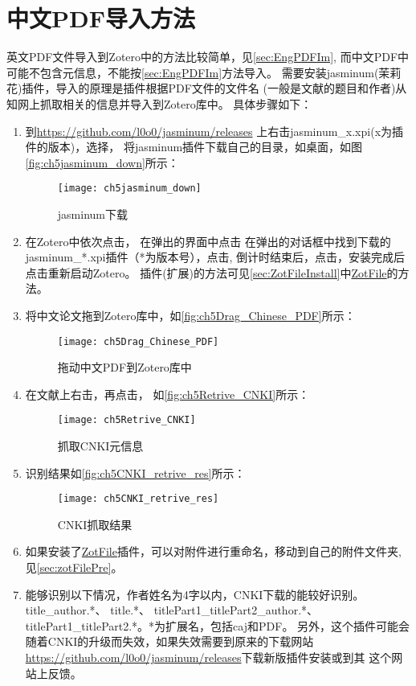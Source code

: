 \documentclass[cn,11pt,chinese]{elegantbook}
\begin{document}
		\section{中文PDF导入方法}\label{sec:Chinese_PDF}
			英文PDF文件导入到Zotero中的方法比较简单，见\cref{sec:EngPDFIm},
			而中文PDF中可能不包含元信息，不能按\cref{sec:EngPDFIm}方法导入。
			需要安装jasminum(茉莉花)插件，导入的原理是插件根据PDF文件的文件名
			(一般是文献的题目和作者)从知网上抓取相关的信息并导入到Zotero库中。
			具体步骤如下：
			\begin{enumerate}
				\item 到\url{https://github.com/l0o0/jasminum/releases}
				上右击jasminum\_x.xpi(x为插件的版本)，选择，
				将jasminum插件下载自己的目录，如桌面，如图\autoref{fig:ch5jasminum_down}所示：
	    		\begin{figure}[ht]
					\centering
					\texttt{[image: ch5jasminum\_down]}
					\caption{jasminum下载}
					\label{fig:ch5jasminum_down}
	    		\end{figure}
				\item 在Zotero中依次点击，
				在弹出的界面中点击
				在弹出的对话框中找到下载的jasminum\_*.xpi插件（*为版本号），点击,
				倒计时结束后，点击，安装完成后点击重新启动Zotero。
				插件(扩展)的方法可见\cref{sec:ZotFileInstall}中\href{http://zotfile.com/}{ZotFile}的方法。
				\item 将中文论文拖到Zotero库中，如\autoref{fig:ch5Drag_Chinese_PDF}所示：
					\begin{figure}[ht]
						\centering
						\texttt{[image: ch5Drag\_Chinese\_PDF]}
						\caption{拖动中文PDF到Zotero库中}
						\label{fig:ch5Drag_Chinese_PDF}
					\end{figure}
				\item 在文献上右击，再点击，
				如\autoref{fig:ch5Retrive_CNKI}所示：
					\begin{figure}[ht]
						\centering
						\texttt{[image: ch5Retrive\_CNKI]}
						\caption{抓取CNKI元信息}
						\label{fig:ch5Retrive_CNKI}
					\end{figure}
				\item 识别结果如\autoref{fig:ch5CNKI_retrive_res}所示：
					\begin{figure}[ht]
						\centering
						\texttt{[image: ch5CNKI\_retrive\_res]}
						\caption{CNKI抓取结果}
						\label{fig:ch5CNKI_retrive_res}
					\end{figure}
				\item 如果安装了\href{http://zotfile.com/}{ZotFile}插件，可以对附件进行重命名，移动到自己的附件文件夹,
				见\cref{sec:zotFilePre}。
				\item 能够识别以下情况，作者姓名为4字以内，CNKI下载的能较好识别。
				title\_author.*、
				title.*、
				titlePart1\_titlePart2\_author.*、
				titlePart1\_titlePart2.*。*为扩展名，包括caj和PDF。
				另外，这个插件可能会随着CNKI的升级而失效，如果失效需要到原来的下载网站
				\url{https://github.com/l0o0/jasminum/releases}下载新版插件安装或到其
				这个网站上反馈。



\end{enumerate}
\end{document}
